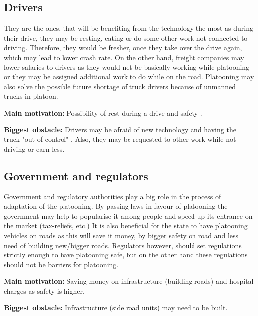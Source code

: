 \subsection{Drivers}
% 
They are the ones, that will be benefiting from the technology the most as during their drive, they may be resting, eating or do some other work not connected to driving. Therefore, they would be fresher, once they take over the drive again, which may lead to lower crash rate. On the other hand, freight companies may lower salaries to drivers as they would not be basically working while platooning or they may be assigned additional work to do while on the road. Platooning may also solve the possible future shortage of truck drivers \cite{OMarah2016TruckImagination} because of unmanned trucks in platoon.\par
% 
\par \textbf{Main motivation:} Possibility of rest during a drive and safety \cite[p. 37]{Chan2012ProjectSARTRE}.\par
% 
\par \textbf{Biggest obstacle:} Drivers may be afraid of new technology and having the truck "out of control" \cite{Sadeghian2016CooperativePrototype}. Also, they may be requested to other work while not driving or earn less.\par
% 
\subsection{Government and regulators}
% 
Government and regulatory authorities play a big role in the process of adaptation of the platooning. By passing laws in favour of platooning the government may help to popularise it among people and speed up its entrance on the market (tax-reliefs, etc.) It is also beneficial for the state to have platooning vehicles on roads as this will save it money, by bigger safety on road and less need of building new/bigger roads. Regulators however, should set regulations strictly enough to have platooning safe, but on the other hand these regulations should not be barriers for platooning.
% 
\par \textbf{Main motivation:} Saving money on infrastructure (building roads) and hospital charges as safety is higher\cite[p. 37]{Chan2012ProjectSARTRE}.
% 
\par \textbf{Biggest obstacle:} Infrastructure (side road units) may need to be built.\par
% 
